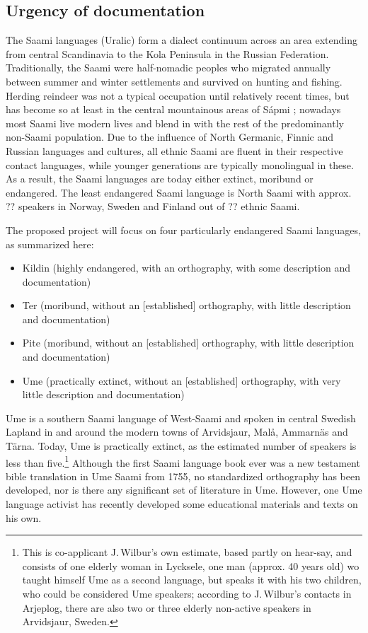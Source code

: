 \documentclass[a4paper,12pt]{article}
\begin{document}
\subsection{Urgency of documentation}%
The Saami languages (Uralic) form a dialect continuum across an area extending from central Scandinavia to the Kola Peninsula in the Russian Federation. Traditionally, the Saami were half-nomadic peoples who migrated annually between summer and winter settlements and survived on hunting and fishing. Herding reindeer was not a typical occupation until relatively recent times, but has become so at least in the central mountainous areas of Sápmi %
; nowadays most Saami live modern lives and blend in with the rest of the predominantly non-Saami population. Due to the influence of North Germanic, Finnic and Russian languages and cultures, all ethnic Saami are fluent in their respective contact languages, while younger generations are typically monolingual in these. As a result, the Saami languages are today either extinct, moribund or endangered. The least endangered Saami language is North Saami with approx. ?? speakers in Norway, Sweden and Finland out of ?? ethnic Saami.%

The proposed project will focus on four particularly endangered Saami languages, as summarized here:
\begin{itemize}
\item Kildin (highly endangered, with an orthography, with some description and documentation)
\item Ter (moribund, without an [established] orthography, with little description and documentation)
\item Pite (moribund, without an [established] orthography, with little description and documentation)
\item Ume (practically extinct, without an [established] orthography, with very little description and documentation)
\end{itemize}

Ume is a southern Saami language of West-Saami and spoken in central Swedish Lapland in and around the modern towns of Arvidsjaur, Malå, Ammarnäs and Tärna. Today, Ume is practically extinct, as the estimated number of speakers is less than five.\footnote{This is co-applicant J.\,Wilbur's own estimate, based partly on hear-say, and consists of one elderly woman in Lycksele, one man (approx. 40 years old) wo taught himself Ume as a second language, but speaks it with his two children, who could be considered Ume speakers; according to J.\,Wilbur's contacts in Arjeplog, there are also two or three elderly non-active speakers in Arvidsjaur, Sweden.} Although the first Saami language book ever was a new testament bible translation in Ume Saami from 1755, no standardized orthography has been developed, nor is there any significant set of literature in Ume. However, one Ume language activist has recently developed some educational materials and texts on his own.
\end{document}
